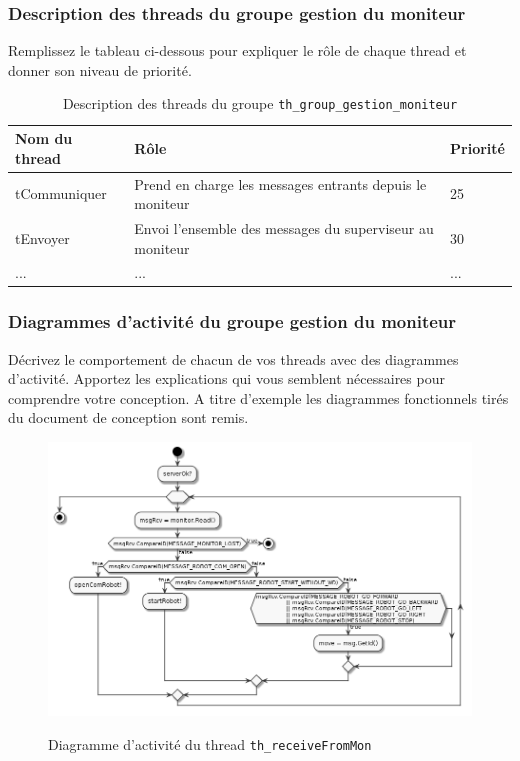 \documentclass[11pt, a4paper]{paper}
\begin{document}
\subsubsection{Description des threads  du groupe gestion du moniteur}
{\color{red} Remplissez le tableau ci-dessous pour expliquer le rôle de chaque thread et donner son niveau de priorité.}


\begin{table}[htp]
\caption{Description des threads du groupe {\tt th\_group\_gestion\_moniteur}}
\begin{center}
\begin{tabular}{|p{3cm}|p{8.5cm}|p{2cm}|}
\hline
\bf Nom du thread &	\bf Rôle &	\bf Priorité \\
\hline
\hline
\color{blue}tCommuniquer	& \color{blue}Prend en charge les messages entrants depuis le moniteur & \color{blue}25\\
\hline
\color{blue}tEnvoyer	& \color{blue}Envoi l'ensemble des messages du superviseur au moniteur & \color{blue}30\\
\hline
\color{blue}... &	\color{blue}... &	\color{blue}...\\
\hline
\end{tabular}
\end{center}
\label{tab:gt_moniteur}
\end{table}%

\subsubsection{Diagrammes d'activité  du groupe gestion du moniteur}
{\color{red}Décrivez le comportement de chacun de vos threads avec des diagrammes d'activité. Apportez les explications qui vous semblent nécessaires pour comprendre votre conception. A titre d'exemple les diagrammes fonctionnels tirés du document de conception sont remis.}

\begin{figure}[htbp]
\label{fig:act_communiquer}
\begin{center}
{\includegraphics[scale=.3]{./figures-pdf/th_receiveFromMon.png}}
{\caption{Diagramme d'activité du thread {\tt th\_receiveFromMon}}}
\end{center}
\end{figure}
\end{document}
